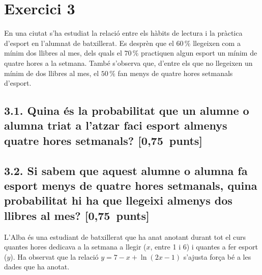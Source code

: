 \documentclass[11pt,a4paper]{article}
\begin{document}
\section*{\textcolor{blauPista}{Exercici 3}}

\noindent En una ciutat s'ha estudiat la relació entre els hàbits de lectura i la pràctica d'esport en l'alumnat de batxillerat. Es desprèn que el $60\,\%$ llegeixen com a mínim dos llibres al mes, dels quals el $70\,\%$ practiquen algun esport un mínim de quatre hores a la setmana. També s'observa que, d'entre els que no llegeixen un mínim de dos llibres al mes, el $50\,\%$ fan menys de quatre hores setmanals d'esport.

\subsection*{3.1. \normalfont Quina és la probabilitat que un alumne o alumna triat a l'atzar faci esport almenys quatre hores setmanals? \hfill\textnormal{[0,75~punts]}}


\subsection*{3.2. \normalfont Si sabem que aquest alumne o alumna fa esport menys de quatre hores setmanals, quina probabilitat hi ha que llegeixi almenys dos llibres al mes? \hfill\textnormal{[0,75~punts]}}


\vspace{0.6em}
\noindent L'Alba és una estudiant de batxillerat que ha anat anotant durant tot el curs quantes hores dedicava a la setmana a llegir ($x$, entre 1 i 6) i quantes a fer esport ($y$). Ha observat que la relació $y = 7 - x + \ln(2x - 1)$ s'ajusta força bé a les dades que ha anotat.
\end{document}
